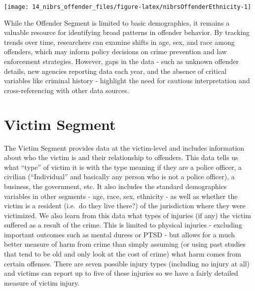 \documentclass[
]{krantz}
\let\origfigure\figure
\let\endorigfigure\endfigure
\renewenvironment{figure}[1][2] {
    \expandafter\origfigure\expandafter[H]
} {
    \endorigfigure
}
\begin{document}
\begin{figure}

{\centering \texttt{[image: 14\_nibrs\_offender\_files/figure-latex/nibrsOffenderEthnicity-1]} 

}

\caption{The share of offenders by ethnicity, 1991-2023.}\label{fig:nibrsOffenderEthnicity}
\end{figure}

While the Offender Segment is limited to basic demographics,
it remains a valuable resource for identifying broad
patterns in offender behavior. By tracking trends over time,
researchers can examine shifts in age, sex, and race among
offenders, which may inform policy decisions on crime
prevention and law enforcement strategies. However, gaps in
the data - such as unknown offender details, new agencies
reporting data each year, and the absence of critical
variables like criminal history - highlight the need for
cautious interpretation and cross-referencing with other
data sources.

\chapter{Victim Segment}\label{victim-segment-1}

The Victim Segment provides data at the victim-level and
includes information about who the victim is and their
relationship to offenders. This data tells us what ``type''
of victim it is with the type meaning if they are a police
officer, a civilian (``Individual'' and basically any person
who is not a police officer), a business, the government,
etc. It also includes the standard demographics variables in
other segments - age, race, sex, ethnicity - as well as
whether the victim is a resident (i.e.~do they live there?)
of the jurisdiction where they were victimized. We also
learn from this data what types of injuries (if any) the
victim suffered as a result of the crime. This is limited to
physical injuries - excluding important outcomes such as
mental duress or PTSD - but allows for a much better measure
of harm from crime than simply assuming (or using past
studies that tend to be old and only look at the cost of
crime) what harm comes from certain offenses. There are
seven possible injury types (including no injury at all) and
victims can report up to five of these injuries so we have a
fairly detailed measure of victim injury.
\end{document}
